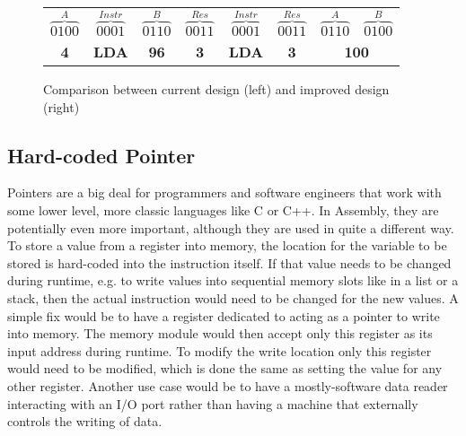 \begin{figure}[ht]
    \begin{center}
        \begin{tabular}{c@{\,}cc@{\,}c|c@{\,}cc@{\,}c}
            $\overbrace{0100}^{A}$ & $\overbrace{0001}^{Instr}$ & $\overbrace{0110}^{B}$ & $\overbrace{0011}^{Res}$ & $\overbrace{0001}^{Instr}$ & $\overbrace{0011}^{Res}$ & $\overbrace{0110}^{A}$ & $\overbrace{0100}^{B}$ \\
            \textbf{4} & \textbf{LDA} & \textbf{96} & \textbf{3} & \textbf{LDA} & \textbf{3} & \multicolumn{2}{c}{\textbf{100}}
        \end{tabular}
    \end{center}
    \caption[Instruction Design Comparison]{Comparison between current design (left) and improved design (right)}
    \label{fig::InstrDesignComp}
\end{figure}

\subsection{Hard-coded Pointer}
Pointers are a big deal for programmers and software engineers that work with some lower level, more classic languages like C or C++. In Assembly, they are potentially even more important, although they are used in quite a different way. To store a value from a register into memory, the location for the variable to be stored is hard-coded into the instruction itself. If that value needs to be changed during runtime, e.g. to write values into sequential memory slots like in a list or a stack, then the actual instruction would need to be changed for the new values. A simple fix would be to have a register dedicated to acting as a pointer to write into memory. The memory module would then accept only this register as its input address during runtime. To modify the write location only this register would need to be modified, which is done the same as setting the value for any other register. Another use case would be to have a mostly-software data reader interacting with an I/O port rather than having a machine that externally controls the writing of data.

